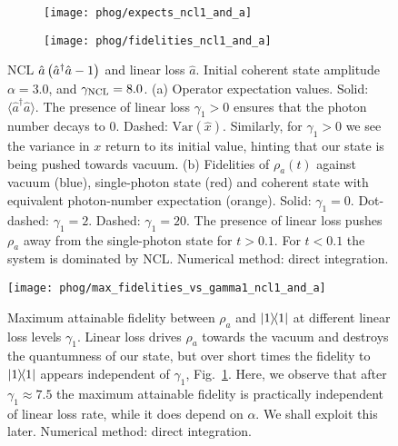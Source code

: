\begin{figure}[htp]
\captionsetup{width=\linewidth}
\centering
	\begin{subfigure}{0.7\linewidth}
	\centering
	\caption{}
	\texttt{[image: phog/expects\_ncl1\_and\_a]}
	\end{subfigure}
	\begin{subfigure}{0.7\linewidth}
	\centering
	\caption{}
	\texttt{[image: phog/fidelities\_ncl1\_and\_a]}
	\end{subfigure}
\caption{\label{fig:phog_A_ncl_loss} NCL $\hat{a}\left(\hat{a}^\dagger \hat{a} - 1\right)$ and linear loss $\hat{a}$. Initial coherent state amplitude $\alpha=3.0$, and $\gamma_{\text{NCL}}=8.0$. (a) Operator expectation values. Solid: $\langle \hat{a}^\dagger \hat{a}\rangle$. The presence of linear loss $\gamma_1 > 0$ ensures that the photon number decays to $0$. Dashed: $\text{Var}\left(\hat{x}\right)$. Similarly, for $\gamma_1 > 0$ we see the variance in $x$ return to its initial value, hinting that our state is being pushed towards vacuum. (b) Fidelities of $\rho_a\left(t\right)$ against vacuum (blue), single-photon state (red) and coherent state with equivalent photon-number expectation (orange). Solid: $\gamma_1 = 0$. Dot-dashed: $\gamma_1 = 2$. Dashed: $\gamma_1 = 20$. The presence of linear loss pushes $\rho_a$ away from the single-photon state for $t > 0.1$. For $t < 0.1$ the system is dominated by NCL. Numerical method: direct integration.}
\end{figure}


\begin{figure}[htp]
\captionsetup{width=\linewidth}
\centering
\texttt{[image: phog/max\_fidelities\_vs\_gamma1\_ncl1\_and\_a]}
\caption{\label{fig:phog_max_fidelity} Maximum attainable fidelity between $\rho_a$ and $\dyad{1}$ at different linear loss levels $\gamma_1$. Linear loss drives $\rho_a$ towards the vacuum and destroys the quantumness of our state, but over short times the fidelity to $\dyad{1}$ appears independent of $\gamma_1$, Fig.~\ref{fig:phog_A_ncl_loss}. Here, we observe that after $\gamma_1 \approx 7.5$ the maximum attainable fidelity is practically independent of linear loss rate, while it does depend on $\alpha$. We shall exploit this later. Numerical method: direct integration.}
\end{figure}

